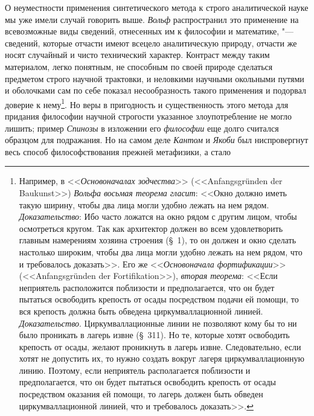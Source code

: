 О неуместности применения синтетического метода к строго
аналитической науке мы уже имели случай говорить выше.
{\em Вольф} распространил
это применение на всевозможные виды сведений, отнесенных им к философии и
математике, "--- сведений, которые отчасти имеют всецело
аналитическую природу, отчасти же носят случайный и чисто технический
характер. Контраст между таким материалом, легко понятным, не способным по
своей природе сделаться предметом строго научной трактовки, и неловкими
научными окольными путями и оболочками сам по себе показал
несообразность такого применения и подорвал доверие к
нему\footnote{Например, в <<{\em Основоначалах зодчества}>>
(<<Anfangsgründen der Baukunst>>) {\em Вольфа восьмая теорема гласит}:
<<Окно должно иметь такую ширину, чтобы два лица
могли удобно лежать на нем рядом. {\em Доказательство}:
Ибо часто ложатся на окно рядом с другим лицом, чтобы
осмотреться кругом. Так как архитектор должен во всем удовлетворить главным
намерениям хозяина строения (\S~1), то он должен и окно сделать настолько
широким, чтобы два лица могли удобно лежать на нем рядом, что и требовалось
доказать>>. Его же <<{\em Основоначала фортификации}>>
(<<Anfangs\-grün\-den der For\-tifika\-tion>>), {\em вторая теорема}:
<<Если неприятель расположится поблизости и предполагается,
что он будет пытаться освободить крепость от осады посредством подачи ей
помощи, то вся крепость должна быть обведена циркумваллационной
линией. {\em Доказательство}.
Циркумваллационные линии не позволяют кому бы то ни было
проникать в лагерь извне (\S~311). Но те, которые хотят освободить крепость
от осады, желают проникнуть в лагерь извне. Следовательно, если хотят не
допустить их, то нужно создать вокруг лагеря циркумваллационную линию.
Поэтому, если неприятель располагается поблизости и предполагается, что он
будет пытаться освободить крепость от осады посредством оказания ей помощи,
то лагерь должен быть обведен циркумваллационной линией, что и требовалось
доказать>>.}. Но веры в пригодность и существенность этого
метода для придания философии научной строгости указанное злоупотребление
не могло лишить; пример {\em Спинозы}
в изложении его
{\em философии} еще долго
считался образцом для подражания. Но на самом деле
{\em Кантом} и
{\em Якоби} был
ниспровергнут весь способ философствования прежней метафизики, а стало
